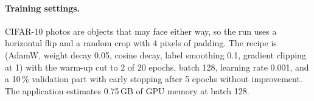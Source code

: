 
\paragraph{Training settings.} CIFAR-10 photos are objects that may face either way, so the run uses a horizontal flip and a random
crop with 4 pixels of padding. The recipe is  (AdamW, weight decay 0.05, cosine decay, label smoothing 0.1,
gradient clipping at 1) with the warm-up cut to 2 of 20 epochs, batch 128, learning rate 0.001, and a 10\,\% validation part with
early stopping after 5 epochs without improvement. The application estimates 0.75\,GB of GPU memory at batch 128.


